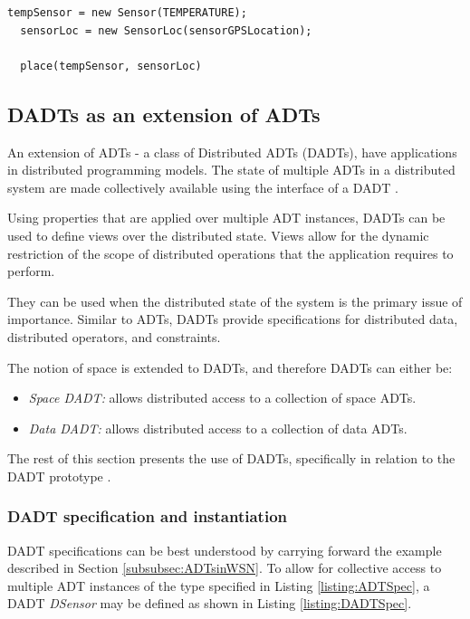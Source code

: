 \begin{lstlisting}[frame=trbl, basewidth={0.55em, 0.6em}, captionpos=b, basicstyle=\ttfamily\footnotesize, breaklines, caption = ADT placement, label = listing:placement ]
  tempSensor = new Sensor(TEMPERATURE);
  sensorLoc = new SensorLoc(sensorGPSLocation);
  
  place(tempSensor, sensorLoc)
\end{lstlisting}

\subsection{DADTs as an extension of ADTs}
An extension of ADTs - a class of Distributed ADTs (DADTs), have applications 
in distributed programming models. The state of multiple ADTs in a distributed
system are made collectively available using the interface of a DADT
\cite{migliavacca_DADT:2006}. 

Using properties that are applied over multiple ADT instances, DADTs can be
used to define views over the distributed state. Views allow for the dynamic
restriction of the scope of distributed operations that the application
requires to perform. 

They can be used when the distributed state 
of the system is the primary issue of importance. Similar to ADTs, DADTs 
provide specifications for distributed data, distributed operators, and 
constraints.

The notion of space is extended to DADTs, and therefore DADTs can either be:

\begin{itemize}
  \item \emph{Space DADT:} allows distributed access to a collection of space
  ADTs. 
  \item \emph{Data DADT:} allows distributed access to a collection of data ADTs.
\end{itemize}

The rest of this section presents the use of DADTs, specifically in relation to
the DADT prototype \cite{migliavacca_DADT:2006}.

\subsubsection{DADT specification and instantiation} \label{subsubsec:dadtspecandinst}

DADT specifications can be best understood by carrying forward the example
described in Section \ref{subsubsec:ADTsinWSN}. To allow for collective access
to multiple ADT instances of the type specified in Listing
\ref{listing:ADTSpec}, a DADT \emph{DSensor} may be defined as shown in Listing
\ref{listing:DADTSpec}.   
 
